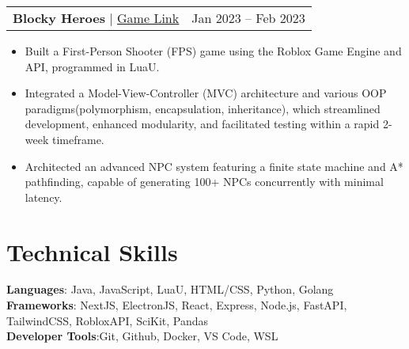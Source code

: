 \documentclass[letterpaper,11pt]{article}
\makeatletter
\newcommand{\resumeItem}[1]{
  \item\small{
    {#1 \vspace{-2pt}}
  }
}
\newcommand{\resumeProjectHeading}[2]{
    \item
    \begin{tabular*}{0.97\textwidth}{l@{\extracolsep{\fill}}r}
      \small#1 & #2 \\
    \end{tabular*}\vspace{-7pt}
}
\newcommand{\resumeSubHeadingListEnd}{\end{itemize}}
\newcommand{\resumeItemListStart}{\begin{itemize}}
\makeatother
\begin{document}
    \resumeProjectHeading
          {\textbf{Blocky Heroes} | \href{https://www.roblox.com/games/12103017573/Game-1-Blocky-Heroes-V0-0-1}
          {\underline{Game Link}}
          }{Jan 2023 -- Feb 2023}
          \resumeItemListStart
          \resumeItem{Built a First-Person Shooter (FPS) game using the Roblox Game Engine and API, programmed in LuaU.}
          \resumeItem{Integrated a Model-View-Controller (MVC) architecture and various OOP paradigms(polymorphism, encapsulation, inheritance), which streamlined development, enhanced modularity, and facilitated testing within a rapid 2-week timeframe.}
          \resumeItem{Architected an advanced NPC system featuring a finite state machine and A* pathfinding, capable of generating 100+ NPCs concurrently with minimal latency.}
\resumeSubHeadingListEnd

    \section{Technical Skills}
     \begin{itemize}[leftmargin=0.15in, label={}]
        \small{\item{
         \textbf{Languages}{: Java, JavaScript, LuaU, HTML/CSS, Python, Golang} \\
         \textbf{Frameworks}{: NextJS, ElectronJS, React, Express, Node.js, FastAPI, TailwindCSS, RobloxAPI, SciKit, Pandas} \\
         \textbf{Developer Tools}{:Git, Github, Docker, VS Code, WSL} \\
        }}
     \end{itemize}
\end{document}
